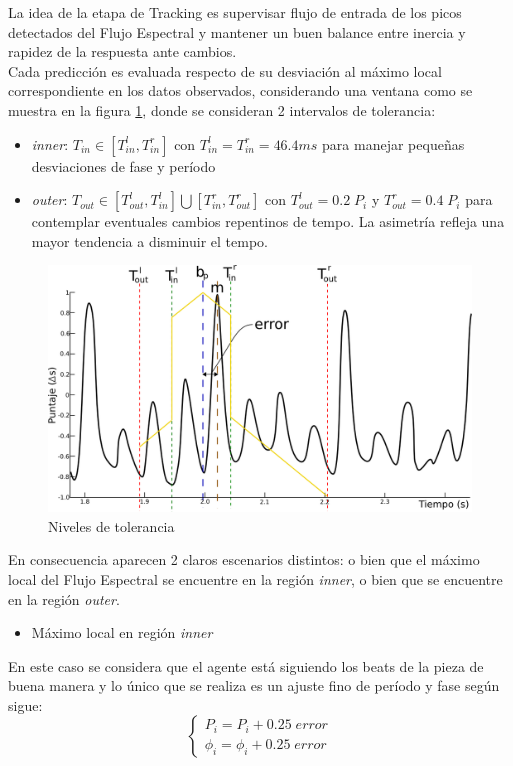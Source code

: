 \documentclass[12pt,a4paper,titlepage]{report}
\begin{document}
La idea de la etapa de Tracking es supervisar flujo de entrada de los picos detectados del Flujo Espectral y mantener un buen balance entre inercia y rapidez de la respuesta ante cambios.\\

Cada predicción es evaluada respecto de su desviación al máximo local correspondiente en los datos observados, considerando una ventana como se muestra en la figura \ref{fig:grafica}, donde se consideran 2 intervalos de tolerancia:
\begin{itemize}
\item \emph{inner}: $T_{in}\in[T_{in}^l,T_{in}^r]$ con $T_{in}^l=T_{in}^r=46.4ms$ para manejar pequeñas desviaciones de fase y período
\item \emph{outer}: $T_{out}\in[T_{out}^l,T_{in}^l] \bigcup [T_{in}^r,T_{out}^r]$ con $T_{out}^l=0.2\;P_i$ y $T_{out}^r=0.4\;P_i$ para contemplar eventuales cambios repentinos de tempo. La asimetría refleja una mayor tendencia a disminuir el tempo.\\
\end{itemize}

\begin{figure}[h!]
  \begin{center}
  \vspace*{-10pt}
  \includegraphics[width=.8\textwidth]{./pics/graficamejor.png}
  \end{center}
  \vspace{-10pt}
  \caption{Niveles de tolerancia}
  \label{fig:grafica}
\end{figure}

En consecuencia aparecen 2 claros escenarios distintos: o bien que el máximo local del Flujo Espectral se encuentre en la región \emph{inner}, o bien que se encuentre en la región \emph{outer}.\\

\begin{itemize} \item Máximo local en región \emph{inner}\end{itemize}
En este caso se considera que el agente está siguiendo los beats de la pieza de buena manera y lo único que se realiza es un ajuste fino de período y fase según sigue:
$$
\begin{cases}
P_i = P_i+0.25\;error\\
\phi_i = \phi_i+0.25\;error
\end{cases}
$$
\end{document}

